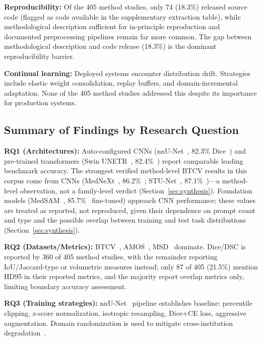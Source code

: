 \textbf{Reproducibility:} Of the 405 method studies, only 74 (18.3\%) released source code (flagged as code available in the supplementary extraction table), while methodological description sufficient for in-principle reproduction and documented preprocessing pipelines remain far more common. The gap between methodological description and code release (18.3\%) is the dominant reproducibility barrier.

\textbf{Continual learning:} Deployed systems encounter distribution drift. Strategies include elastic weight consolidation, replay buffers, and domain-incremental adaptation. None of the 405 method studies addressed this despite its importance for production systems.

\subsection{Summary of Findings by Research Question}

\textbf{RQ1 (Architectures):} Auto-configured CNNs (nnU-Net~\cite{isensee2021nnunet}, 82.3\% Dice~\cite{isensee2021nnunet}) and pre-trained transformers (Swin UNETR~\cite{swinunetr2022}, 82.4\%~\cite{tang2022selfsupervised}) report comparable leading benchmark accuracy. The strongest verified method-level BTCV results in this corpus come from CNNs (MedNeXt~\cite{roy2023mednext}, 86.2\%~\cite{roy2023mednext}; STU-Net~\cite{huang2023stunet}, 87.1\%~\cite{huang2023stunet})---a method-level observation, not a family-level verdict (Section~\ref{sec:synthesis}). Foundation models (MedSAM~\cite{ma2024medsam}, 85.7\%~\cite{ma2024medsam} fine-tuned) approach CNN performance; these values are treated as reported, not reproduced, given their dependence on prompt count and type and the possible overlap between training and test task distributions (Section~\ref{sec:synthesis}).

\textbf{RQ2 (Datasets/Metrics):} BTCV~\cite{btcv2015}, AMOS~\cite{amos2022}, MSD~\cite{msd2022} dominate. Dice/DSC is reported by 360 of 405 method studies, with the remainder reporting IoU/Jaccard-type or volumetric measures instead; only 87 of 405 (21.5\%) mention HD95 in their reported metrics, and the majority report overlap metrics only, limiting boundary accuracy assessment.

\textbf{RQ3 (Training strategies):} nnU-Net~\cite{isensee2021nnunet} pipeline establishes baseline: percentile clipping, z-score normalization, isotropic resampling, Dice+CE loss, aggressive augmentation. Domain randomization is used to mitigate cross-institution degradation~\cite{isensee2021nnunet, wasserthal2023totalsegmentator}.

